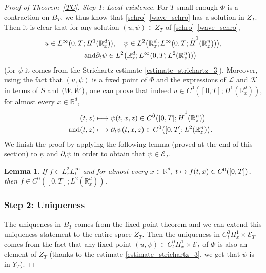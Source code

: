 \documentclass[11pt]{article}
\newcommand\mto{\mathchoice{\longmapsto}{\mapsto}{\mapsto}{\mapsto}}
\DeclareRobustCommand{\accentset}[2]{\overset{#1}{#2}}
\newtheorem{lemma}{Lemma}[section]
\theoremstyle{definition}
\newcommand*{\overbigdot}[1]{%
\accentset{\mbox{\large\bfseries .}}{#1}}
\newenvironment{ProofOf}[1]{\begin{proof}[Proof of #1]}{\end{proof}}
\newcommand{\R}{\mathbb{R}}
\begin{document}
\begin{ProofOf}{Theorem~\ref{TC}. Step 1: Local existence} For $T$ small enough $\Phi$ is a contraction on $B_{T}$, we thus know that \eqref{schro}--\eqref{wave_schro} has a solution in $Z_{T}$. Then it is clear that for any solution $(u,\psi)\in Z_{T}$ of \eqref{schro}--\eqref{wave_schro},
\begin{gather*}
u\in L^{\infty}(0,T;H^{1}(\R_{x}^{d})),\quad \psi\in L^{2}\bigl(\R_{x}^{d};L^{\infty}(0,T;\overbigdot{H}^{1}(\R_{z}^{n}))\bigr),\\
\tag*{and} \partial_{t}\psi\in L^{2}\bigl(\R_{x}^{d};L^{\infty}(0,T;L^{2}(\R_{z}^{n}))\bigr)
\end{gather*}
(for $\psi$ it comes from the Strichartz estimate \eqref{estimate_strichartz_3}). Moreover, using the fact that $(u,\psi)$ is a fixed point of $\Phi$ and the expressions of $\mathcal{L}$ and $\mathcal{K}$ in terms of $S$ and $(W,\overbigdot{W})$, one can prove that indeed $u\in C^{0}\left([0,T];H^{1}(\R_{x}^{d})\right)$, for almost every $x\in\R^{d}$,\vspace*{-3pt}
\begin{align*}
(t,z)&\mto \psi(t,x,z)\in C^{0}\bigl([0,T];\overbigdot{H}^{1}(\R_{z}^{n})\bigr)\\
\tag*{and}
(t,z)&\mto\partial_{t}\psi(t,x,z)\in C^{0}\bigl([0,T];L^{2}(\R_{z}^{n})\bigr).
\end{align*}
We finish the proof by applying the following lemma (proved at the end of this section) to $\psi$ and $\partial_{t}\psi$ in order to obtain that $\psi\in\mathcal{E}_{T}$.
\begin{lemma}\label{lemma_continuity}
If $f\in L_{x}^{2}L_{t}^{\infty}$ and for almost every $x\in\R^{d}$, $t\mto f(t,x)\in C^{0}([0,T])$, then $f\in C^{0}\left([0,T];L^{2}(\R_{x}^{d})\right)$.
\end{lemma}

\subsubsection*{Step 2: Uniqueness} The uniqueness in $B_{T}$ comes from the fixed point theorem and we can extend this uniqueness statement to the entire space $Z_{T}$. Then the uniqueness in $C_{t}^{0}H_{x}^{1}\times\mathcal{E}_{T}$ comes from the fact that any fixed point $(u,\psi)\in C_{t}^{0}H_{x}^{1}\times\mathcal{E}_{T}$ of $\Phi$ is also an element of $Z_{T}$ (thanks to the estimate \eqref{estimate_strichartz_3}, we get that $\psi$ is in $Y_{T}$).


\end{ProofOf}
\end{document}

